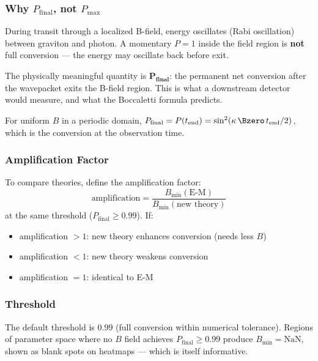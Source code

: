 \subsubsection{Why $P_\text{final}$, not $P_\text{max}$}
\label{sec:pfinal-vs-pmax}

During transit through a localized B-field, energy oscillates (Rabi
oscillation) between graviton and photon. A momentary $P = 1$ inside the
field region is \textbf{not} full conversion --- the energy may oscillate back
before exit.

The physically meaningful quantity is $\bm{P_\text{final}}$: the permanent net
conversion after the wavepacket exits the B-field region. This is what a
downstream detector would measure, and what the Boccaletti formula predicts.

For uniform $B$ in a periodic domain, $P_\text{final} = P(t_\text{end}) = \sin^2(\kappa\, \Bzero\, t_\text{end} / 2)$, which is the conversion at the observation time.

\subsubsection{Amplification Factor}
\label{sec:amplification}

To compare theories, define the amplification factor:
\begin{equation}
  \text{amplification} = \frac{B_\text{min}(\text{E-M})}{B_\text{min}(\text{new theory})}
  \label{eq:amplification}
\end{equation}
at the same threshold ($P_\text{final} \geq 0.99$). If:
\begin{itemize}
  \item amplification $> 1$: new theory enhances conversion (needs less $B$)
  \item amplification $< 1$: new theory weakens conversion
  \item amplification $= 1$: identical to E-M
\end{itemize}

\subsubsection{Threshold}
\label{sec:threshold}

The default threshold is $0.99$ (full conversion within numerical tolerance).
Regions of parameter space where no $B$ field achieves $P_\text{final} \geq 0.99$
produce $B_\text{min} = \text{NaN}$, shown as blank spots on heatmaps --- which is
itself informative.


